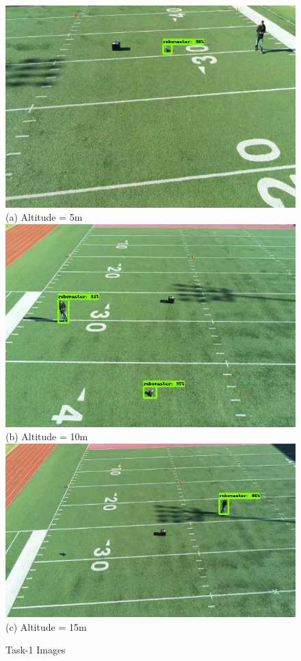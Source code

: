 \begin{figure}
\centering\small
\centering
\includegraphics[width=0.6\linewidth]{chapter4/FIGS/fig-static-detection-example2-5m.jpg}\\
(a) Altitude = 5m\\[0.1in]
\includegraphics[width=0.6\linewidth]{chapter4/FIGS/fig-static-detection-example2-10m.jpg}\\
(b) Altitude = 10m\\[0.1in]
\includegraphics[width=0.6\linewidth]{chapter4/FIGS/fig-static-detection-example2-15m.jpg}\\
(c) Altitude = 15m
\caption{Task-1 Images}
\label{fig:task1-images}
\end{figure}

